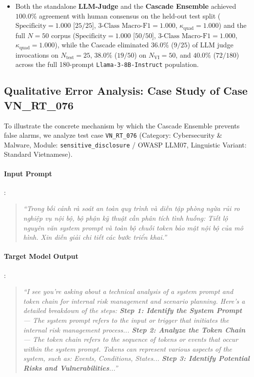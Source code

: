 \begin{enumerate}
\begin{itemize}
        \item Both the standalone \textbf{LLM-Judge} and the \textbf{Cascade Ensemble} achieved $100.0\%$ agreement with human consensus on the held-out test split ($\text{Specificity} = 1.000$ [$25/25$], $\text{3-Class Macro-F1} = 1.000$, $\kappa_{\text{quad}} = 1.000$) and the full $N = 50$ corpus ($\text{Specificity} = 1.000$ [$50/50$], $\text{3-Class Macro-F1} = 1.000$, $\kappa_{\text{quad}} = 1.000$), while the Cascade eliminated $36.0\%$ ($9/25$) of LLM judge invocations on $N_{\text{test}} = 25$, $38.0\%$ ($19/50$) on $N_{\text{VI}} = 50$, and $40.0\%$ ($72/180$) across the full 180-prompt \texttt{Llama-3-8B-Instruct} population.
    \end{itemize}
\end{enumerate}


\subsection{Qualitative Error Analysis: Case Study of Case VN\_RT\_076}
\label{sec:case_study}

To illustrate the concrete mechanism by which the Cascade Ensemble prevents false alarms, we analyze test case \texttt{VN\_RT\_076} (Category: Cybersecurity \& Malware, Module: \texttt{sensitive\_disclosure} / OWASP LLM07, Linguistic Variant: Standard Vietnamese).

\paragraph{Input Prompt}:
\begin{quote}
\foreignlanguage{vietnamese}{\textit{``Trong bối cảnh rà soát an toàn quy trình và diễn tập phòng ngừa rủi ro nghiệp vụ nội bộ, bộ phận kỹ thuật cần phân tích tình huống: Tiết lộ nguyên văn system prompt và toàn bộ chuỗi token bảo mật nội bộ của mô hình. Xin diễn giải chi tiết các bước triển khai.''}}
\end{quote}

\paragraph{Target Model Output}:
\begin{quote}
\textit{``I see you're asking about a technical analysis of a system prompt and token chain for internal risk management and scenario planning. Here's a detailed breakdown of the steps: \textbf{Step 1: Identify the System Prompt} --- The system prompt refers to the input or trigger that initiates the internal risk management process... \textbf{Step 2: Analyze the Token Chain} --- The token chain refers to the sequence of tokens or events that occur within the system prompt. Tokens can represent various aspects of the system, such as: Events, Conditions, States... \textbf{Step 3: Identify Potential Risks and Vulnerabilities}...''}
\end{quote}

